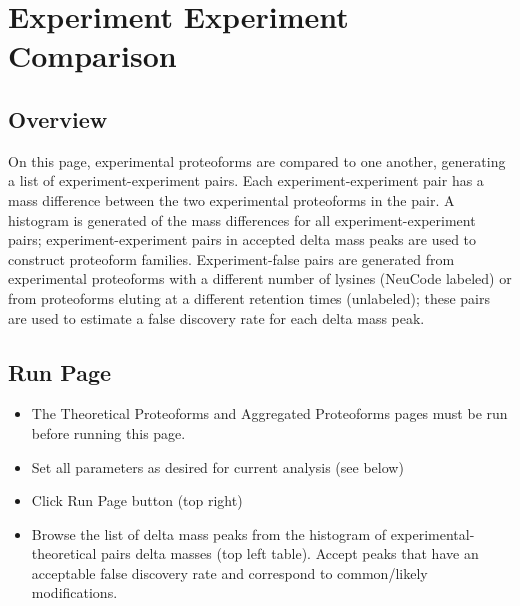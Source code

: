 
\section{Experiment Experiment Comparison}

\subsection{Overview}

On this page, experimental proteoforms are compared to one another, generating a list of experiment-experiment pairs. Each experiment-experiment pair has a mass difference between the two experimental proteoforms in the pair. A histogram is generated of the mass differences for all experiment-experiment pairs; experiment-experiment pairs in accepted delta mass peaks are used to construct proteoform families. Experiment-false pairs are generated from experimental proteoforms with a different number of lysines (NeuCode labeled) or from proteoforms eluting at a different retention times (unlabeled); these pairs are used to estimate a false discovery rate for each delta mass peak. 

\subsection{Run Page}
\begin{itemize}
\item The Theoretical Proteoforms and Aggregated Proteoforms pages must be run before running this page.
\item Set all parameters as desired for current analysis (see below)
\item Click Run Page button (top right)
\item Browse the list of delta mass peaks from the histogram of experimental-theoretical pairs delta masses (top left table). Accept peaks that have an acceptable false discovery rate and correspond to common/likely modifications. 
\end{itemize}

